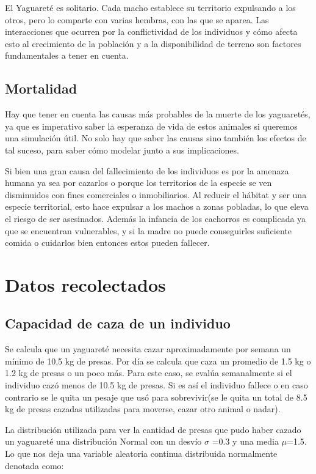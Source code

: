 \documentclass{article}
\begin{document}
    El Yaguareté es solitario. Cada macho establece su territorio expulsando a los otros, pero lo comparte con varias hembras, con las que se aparea. Las interacciones que ocurren por la conflictividad de los individuos y cómo afecta esto al crecimiento de la población y a la disponibilidad de terreno son factores fundamentales a tener en cuenta.
    
    \subsection{Mortalidad}
    Hay que tener en cuenta las causas más probables de la muerte de los yaguaretés, ya que es imperativo saber la esperanza de vida de estos animales si queremos una simulación útil. No solo hay que saber las causas sino también los efectos de tal suceso, para saber cómo modelar junto a sus implicaciones.
    
    Si bien una gran causa del fallecimiento de los individuos es por la amenaza humana ya sea por cazarlos o porque los territorios de la especie se ven disminuidos con fines comerciales o inmobiliarios. Al reducir el hábitat y ser una especie territorial, esto hace expulsar a los machos a zonas pobladas, lo que eleva el riesgo de ser asesinados.
    Además la infancia de los cachorros es complicada ya que se encuentran vulnerables, y si la madre no puede conseguirles suficiente comida o cuidarlos bien entonces estos pueden fallecer.

\section{Datos recolectados}
    \subsection{Capacidad de caza de un individuo}
    Se calcula que un yaguareté necesita cazar aproximadamente por semana un mínimo de 10,5 kg de presas. Por día se calcula que caza un promedio de 1.5 kg o 1.2 kg de presas o un poco más. Para este caso, se evalúa semanalmente si el individuo cazó menos de 10.5 kg de presas. Si es así el individuo fallece o en caso contrario se le quita un pesaje que usó para sobrevivir(se le quita un total de 8.5 kg de presas cazadas utilizadas para moverse, cazar otro animal o nadar).
    
    La distribución utilizada para ver la cantidad de presas que pudo haber cazado un yaguareté una distribución Normal con un desvío $\sigma$ =0.3 y una media $\mu$=1.5. Lo que nos deja una variable aleatoria continua distribuida normalmente denotada como:
\end{document}
